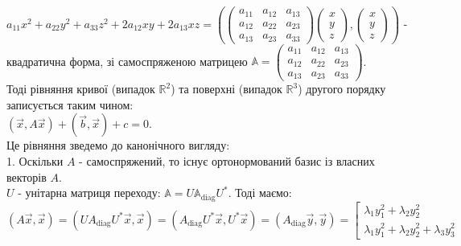 \documentclass[a4paper, 10pt]{article}
\theoremstyle{theoremdd}
\begin{document}
$a_{11}x^2 + a_{22}y^2 + a_{33}z^2 + 2a_{12}xy + 2a_{13}xz = \left(\begin{pmatrix}
a_{11} & a_{12} & a_{13} \\
a_{12} & a_{22} & a_{23} \\
a_{13} & a_{23} & a_{33}
\end{pmatrix} \begin{pmatrix}
x \\ y \\ z
\end{pmatrix}, \begin{pmatrix}
x \\ y \\ z
\end{pmatrix} \right)$ - квадратична форма, зі самоспряженою матрицею $\mathbb{A} = \begin{pmatrix}
a_{11} & a_{12} & a_{13} \\
a_{12} & a_{22} & a_{23} \\
a_{13} & a_{23} & a_{33}
\end{pmatrix}$.
\bigskip \\
Тоді рівняння кривої (випадок $\mathbb{R}^2$) та поверхні (випадок $\mathbb{R}^3$) другого порядку записується таким чином:\\
$(\vec{x}, A \vec{x}) + (\vec{b}, \vec{x}) + c = 0$.\\
Це рівняння зведемо до канонічного вигляду:\\
1. Оскільки $A$ - самоспряжений, то існує ортонормований базис із власних векторів $A$.\\
$U$ - унітарна матриця переходу: $\mathbb{A} = U \mathbb{A}_{\textrm{diag}} U^*$. Тоді маємо:\\
$(A\vec{x}, \vec{x}) = (U A_{\textrm{diag}} U^* \vec{x}, \vec{x}) = (A_{\textrm{diag}} U^* \vec{x}, U^* \vec{x}) = (A_{\textrm{diag}}\vec{y}, \vec{y}) = \left[ \begin{gathered} \lambda_1 y_1^2 + \lambda_2 y_2^2 \\
\lambda_1 y_1^2 + \lambda_2 y_2^2 + \lambda_3 y_3^2
 \end{gathered} \right.$
\end{document}
